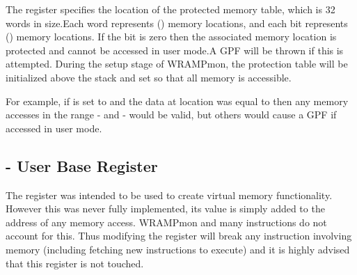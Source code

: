 The  register specifies the location of the protected memory table, 
which is 32 words in size.Each word represents  () memory
locations, and each bit represents  () memory locations.
If the bit is zero then the associated memory location is protected and cannot 
be accessed in user mode.A GPF will be thrown if this is attempted.
During the setup stage of WRAMPmon, the protection table will be initialized 
above the stack and set so that all memory is accessible.

For example, if  is set to  and the data at location 
 was equal to  then any memory accesses in the range 
- and - would be valid, but others 
would cause a GPF if accessed in user mode.

\subsection{ - User Base Register}

The  register was intended to be used to create virtual memory 
functionality.
However this was never fully implemented, its value is simply added to the 
address of any memory access. WRAMPmon and many instructions do not account 
for this. Thus modifying the  register will break any instruction 
involving memory (including fetching new instructions to execute) and it is 
highly advised that this register is not touched.








